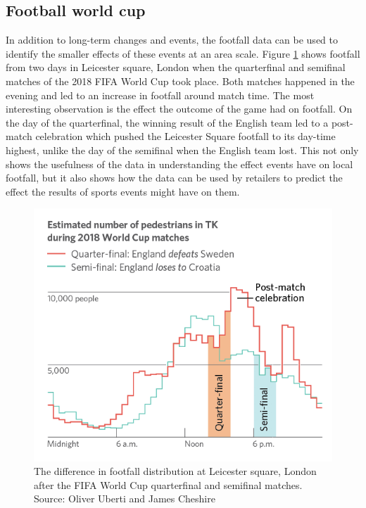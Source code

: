 \subsection{Football world cup}
In addition to long-term changes and events, the footfall data can be used to identify the smaller effects of these events at an area scale.
Figure \ref{figure:applications:football} shows footfall from two days in Leicester square, London when the quarterfinal and semifinal matches of the 2018 FIFA World Cup took place. 
Both matches happened in the evening and led to an  increase in footfall around match time. 
The most interesting observation is the effect the outcome of the game had on footfall. 
On the day of the quarterfinal, the winning result of the English team led to a post-match celebration which pushed the Leicester Square footfall to its day-time highest, unlike the day of the semifinal when the English team lost. 
This not only shows the usefulness of the data in understanding the effect events have on local footfall, but it also shows how the data can be used by retailers to predict the effect the results of sports events might have on them.

\begin{figure}
  \includegraphics[trim={0 0 0 0},clip]{images/applications-football-sample.png}
  \caption{The difference in footfall distribution at Leicester square, London after the FIFA World Cup quarterfinal and semifinal matches. Source: Oliver Uberti and James Cheshire }
  \label{figure:applications:football}
\end{figure}

